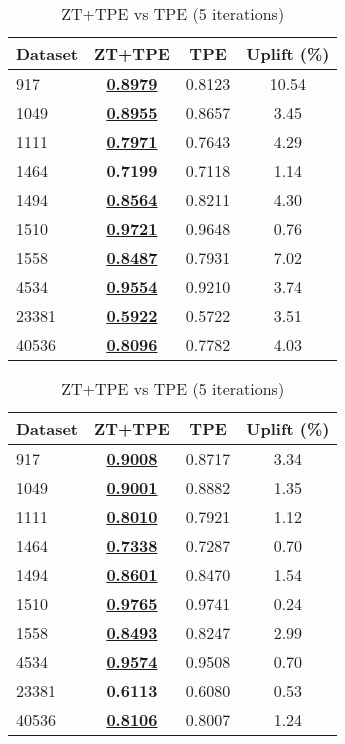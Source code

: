 \begin{table}[htbp]
\begin{center}
\begin{small}
\begin{sc}
\begin{subtable}[t]{0.48\textwidth}
    \centering
    \caption{ZT+TPE vs TPE (1 iteration)}
    \label{tab:decisiontree-optuna-1}
    \begin{tabular}{lccc}
    \toprule
    \textbf{Dataset} & \textbf{ZT+TPE} & \textbf{TPE} & \textbf{Uplift (\%)} \\
    \midrule
    917    & \underline{\textbf{0.8979}} & 0.8123 & 10.54 \\
    1049    & \underline{\textbf{0.8955}} & 0.8657 & 3.45 \\
    1111    & \underline{\textbf{0.7971}} & 0.7643 & 4.29 \\
    1464    & \textbf{0.7199} & 0.7118 & 1.14 \\
    1494    & \underline{\textbf{0.8564}} & 0.8211 & 4.30 \\
    1510    & \underline{\textbf{0.9721}} & 0.9648 & 0.76 \\
    1558    & \underline{\textbf{0.8487}} & 0.7931 & 7.02 \\
    4534    & \underline{\textbf{0.9554}} & 0.9210 & 3.74 \\
    23381    & \underline{\textbf{0.5922}} & 0.5722 & 3.51 \\
    40536    & \underline{\textbf{0.8096}} & 0.7782 & 4.03 \\
    \bottomrule
    \end{tabular}
\end{subtable}
\hfill
\begin{subtable}[t]{0.48\textwidth}
    \centering
    \caption{ZT+TPE vs TPE (5 iterations)}
    \label{tab:decisiontree-optuna-5}
    \begin{tabular}{lccc}
    \toprule
    \textbf{Dataset} & \textbf{ZT+TPE} & \textbf{TPE} & \textbf{Uplift (\%)} \\
    \midrule
    917    & \underline{\textbf{0.9008}} & 0.8717 & 3.34 \\
    1049    & \underline{\textbf{0.9001}} & 0.8882 & 1.35 \\
    1111    & \underline{\textbf{0.8010}} & 0.7921 & 1.12 \\
    1464    & \underline{\textbf{0.7338}} & 0.7287 & 0.70 \\
    1494    & \underline{\textbf{0.8601}} & 0.8470 & 1.54 \\
    1510    & \underline{\textbf{0.9765}} & 0.9741 & 0.24 \\
    1558    & \underline{\textbf{0.8493}} & 0.8247 & 2.99 \\
    4534    & \underline{\textbf{0.9574}} & 0.9508 & 0.70 \\
    23381    & \textbf{0.6113} & 0.6080 & 0.53 \\
    40536    & \underline{\textbf{0.8106}} & 0.8007 & 1.24 \\
    \bottomrule
    \end{tabular}
\end{subtable}


\end{sc}
\end{small}
\end{center}
\end{table}
